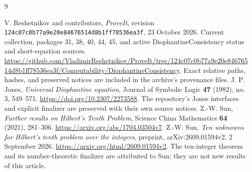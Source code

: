 \documentclass[11pt,a4paper]{article}
\newcommand{\pin}{\texttt{124c07c0b77a9e20e84676514d8b1ff78536ea3f}}
\theoremstyle{definition}
\theoremstyle{remark}
\numberwithin{equation}{section}
\begin{document}
\clearpage
\begin{thebibliography}{9}
\raggedright
{}
V. Reshetnikov and contributors, \emph{ProveIt}, revision \pin,
23 October 2026. Current collection, packages 31, 38, 40, 44, 45,
and active DiophantineConsistency status and short-equation sources.
\url{https://github.com/VladimirReshetnikov/ProveIt/tree/124c07c0b77a9e20e84676514d8b1ff78536ea3f/Computability/DiophantineConsistency}.
Exact relative paths, hashes, and preserved notices are included in
the archive's provenance files.
J. P. Jones, \emph{Universal Diophantine equation},
Journal of Symbolic Logic \textbf{47} (1982), no. 3, 549--571.
\url{https://doi.org/10.2307/2273588}.
The repository's Jones interfaces and explicit finalizer are preserved
with their own source notices.
Z.-W. Sun, \emph{Further results on Hilbert's Tenth Problem},
Science China Mathematics \textbf{64} (2021), 281--306.
\url{https://arxiv.org/abs/1704.03504v7}.
Z.-W. Sun, \emph{Ten unknowns for Hilbert's tenth problem over the integers},
preprint, arXiv:2609.01594v2, 2 September 2026.
\url{https://arxiv.org/html/2609.01594v2}.
The ten-integer theorem and its number-theoretic finalizer are
attributed to Sun; they are not new results of this article.
\end{thebibliography}
\end{document}
